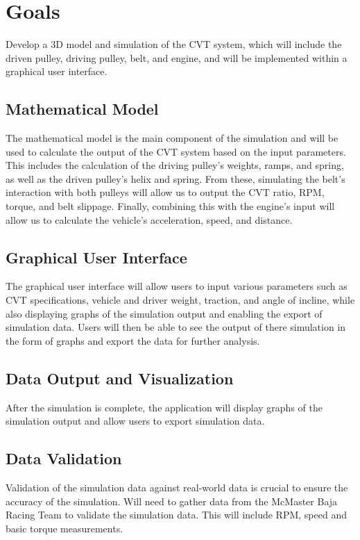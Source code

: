 \documentclass{article}
\begin{document}
\section{Goals}

Develop a 3D model and simulation of the CVT system, which will include the driven pulley, 
driving pulley, belt, and engine, and will be implemented within a graphical user interface.

\subsection{Mathematical Model}
The mathematical model is the main component of the simulation and will be used to 
calculate the output of the CVT system based on the input parameters.
This includes the calculation of the driving pulley's weights, ramps, and spring, 
as well as the driven pulley's helix and spring.
From these, simulating the belt's interaction with both pulleys will allow us to output 
the CVT ratio, RPM, torque, and belt slippage. Finally, combining this with the engine's input
will allow us to calculate the vehicle's acceleration, speed, and distance.

\subsection{Graphical User Interface}
The graphical user interface will allow users to input various parameters such as CVT specifications, vehicle and driver weight, traction, and angle of incline, while also displaying graphs of the simulation output and enabling the export of simulation data. 
Users will then be able to see the output of there simulation in the form of graphs and export the data for further analysis. 

\subsection{Data Output and Visualization}
After the simulation is complete, the application will display graphs of the simulation output 
and allow users to export simulation data.

\subsection{Data Validation}
Validation of the simulation data against real-world data is crucial to ensure the accuracy of 
the simulation. Will need to gather data from the McMaster Baja Racing Team to validate the 
simulation data. This will include RPM, speed and basic torque measurements.
\end{document}
